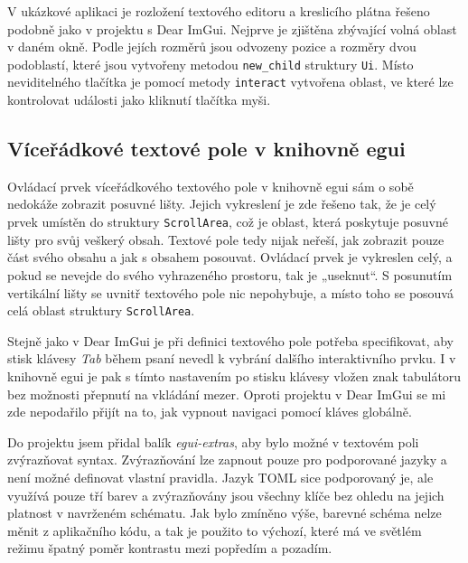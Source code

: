 \documentclass[FM,DP]{tulthesis}
\begin{document}
	V ukázkové aplikaci je rozložení textového editoru a kreslicího plátna řešeno podobně jako v projektu s Dear ImGui. Nejprve je zjištěna zbývající volná oblast v daném okně. Podle jejích rozměrů jsou odvozeny pozice a rozměry dvou podoblastí, které jsou vytvořeny metodou \texttt{new\_child} struktury \texttt{Ui}. Místo neviditelného tlačítka je pomocí metody \texttt{interact} vytvořena oblast, ve které lze kontrolovat události jako kliknutí tlačítka myši.
	
	
	\subsection{Víceřádkové textové pole v knihovně egui}
	
	Ovládací prvek víceřádkového textového pole v knihovně egui sám o sobě nedokáže zobrazit posuvné lišty. Jejich vykreslení je zde řešeno tak, že je celý prvek umístěn do struktury \texttt{ScrollArea}, což je oblast, která poskytuje posuvné lišty pro svůj veškerý obsah. Textové pole tedy nijak neřeší, jak zobrazit pouze část svého obsahu a jak s obsahem posouvat. Ovládací prvek je vykreslen celý, a pokud se nevejde do svého vyhrazeného prostoru, tak je „useknut“. S posunutím vertikální lišty se uvnitř textového pole nic nepohybuje, a místo toho se posouvá celá oblast struktury \texttt{ScrollArea}.
	
	Stejně jako v Dear ImGui je při definici textového pole potřeba specifikovat, aby stisk klávesy \textit{Tab} během psaní nevedl k vybrání dalšího interaktivního prvku. I v knihovně egui je pak s tímto nastavením po stisku klávesy vložen znak tabulátoru bez možnosti přepnutí na vkládání mezer. Oproti projektu v Dear ImGui se mi zde nepodařilo přijít na to, jak vypnout navigaci pomocí kláves globálně.

	Do projektu jsem přidal balík \textit{egui-extras}, aby bylo možné v textovém poli zvýrazňovat syntax. Zvýrazňování lze zapnout pouze pro podporované jazyky a není možné definovat vlastní pravidla. Jazyk TOML sice podporovaný je, ale využívá pouze tří barev a zvýrazňovány jsou všechny klíče bez ohledu na jejich platnost v navrženém schématu. Jak bylo zmíněno výše, barevné schéma nelze měnit z aplikačního kódu, a tak je použito to výchozí, které má ve světlém režimu špatný poměr kontrastu mezi popředím a pozadím.%
\end{document}
